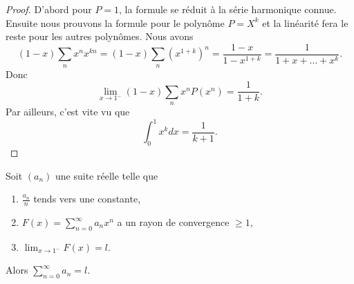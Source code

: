 \begin{proof}
    D'abord pour \( P=1\), la formule se réduit à la série harmonique connue. Ensuite nous prouvons la formule pour le polynôme \( P=X^k\) et la linéarité fera le reste pour les autres polynômes. Nous avons
    \begin{equation}
        (1-x)\sum_nx^nx^{kn}=(1-x)\sum_n(x^{1+k})^n=\frac{ 1-x }{ 1-x^{1+k} }=\frac{1}{ 1+x+\ldots+x^k }.
    \end{equation}
    Donc
    \begin{equation}
        \lim_{x\to 1^-} (1-x)\sum_nx^nP(x^n)=\frac{1}{ 1+k }.
    \end{equation}
    Par ailleurs, c'est vite vu que
    \begin{equation}
        \int_0^1 x^kdx=\frac{1}{ k+1 }.
    \end{equation}
\end{proof}

\begin{theorem}
    Soit \( (a_n)\) une suite réelle telle que
    \begin{enumerate}
        \item
            \( \frac{ a_n }{ n }\) tends vers une constante,
        \item
            \( F(x)=\sum_{n=0}^{\infty}a_nx^n\) a un rayon de convergence \( \geq 1\),
        \item
            \( \lim_{x\to 1^-} F(x)=l\).
    \end{enumerate}
    Alors \( \sum_{n=0}^{\infty}a_n=l\).
\end{theorem}

